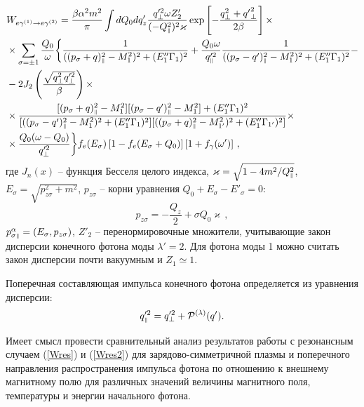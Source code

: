 \begin{equation}
	\begin{aligned}\label{Wres2}
		&W_{e\gamma^{(1)}\to e\gamma^{(2)}}=\frac{\beta\alpha^2m^2}{\pi} \int 
		dQ_0dq'_z \frac{q_\perp'^2\omega Z_2'} 
		{(-Q_{\mbox{\tiny $\|$}}^2)^2\varkappa}\exp\left[-\frac{q_\perp^2+{q'}_\perp^2}{2\beta}\right]
		\times
		\\
		\nonumber&\times\sum_{\sigma=\pm 
			1}\frac{Q_0}{\omega}\bigg\{
		\frac{1}{((p_\sigma+q)_{\mbox{\tiny $\|$}}^2-M_1^2)^2+(E''_1\Gamma_1)^2}+\frac{Q_0 \omega}{ q'^2_{\mbox{\tiny $\|$}}}\frac{1}{((p_\sigma-q')_{\mbox{\tiny $\|$}}^2-M_1^2)^2+(E''_1\Gamma_1)^2}-
		\\
		\nonumber&-2 J_{2}\left(\frac{\sqrt{q_\perp^2q_\perp'^2}}{\beta}\right)
		\times
		\\
		\nonumber&\times\frac{[(p_\sigma+q)^2_{\mbox{\tiny $\|$}}-M_1^2][(p_\sigma-q')^2_{\mbox{\tiny $\|$}}-M^2_{1}]+(E''_1\Gamma_1)^2}{[((p_\sigma-q')_{\mbox{\tiny $\|$}}^2-M_1^2)^2+(E''_1\Gamma_1)^2][((p_\sigma+q)_{\mbox{\tiny $\|$}}^2-M_{1'}^2)^2+(E''_1\Gamma_{1'})^2]}
		\times\\\nonumber&\times
		\frac{Q_0(\omega-Q_0)}{q'^2_\perp}
		\bigg\}f_e{(E_\sigma)}\left[1-f_e{(E_\sigma+Q_0)}\right]\left[1+f_\gamma(\omega')\right]
		\, ,
	\end{aligned}
\end{equation}
\noindent где $J_n(x)$ -- функция Бесселя целого индекса, 
\mbox{$\varkappa = \sqrt{1 - 4m^2/Q^2_{\mbox{\tiny $\|$}}}$, 
	$E_\sigma=\sqrt{p_{z\sigma}^2+m^2}$}, $p_{z\sigma}$ -- корни уравнения 
$Q_0+E_\sigma-E'_\sigma=0$:
\begin{equation}\label{savelaw}
	p_{z\sigma}=-\frac{Q_z}{2}+ \sigma Q_0 \varkappa\, ,
\end{equation}
$p^\alpha_{\sigma\mbox{\tiny $\|$}}=(E_\sigma,p_{z\sigma})$, $Z'_{2}$ -- перенормировочные множители, учитывающие закон дисперсии конечного фотона моды $\lambda' = 2$. Для фотона моды 1 можно считать закон дисперсии почти вакуумным и $Z_1\simeq 1$.

Поперечная составляющая импульса конечного фотона определяется из уравнения 
дисперсии:
\begin{equation}
	q'^2_{\mbox{\tiny $\|$}}=q'^{2}_\perp + {\cal P}^{(\lambda)}(q') .
\end{equation}

Имеет смысл провести сравнительный анализ результатов работы \cite{Chistyakov:2009}  с резонансным случаем (\ref{Wres}) и (\ref{Wres2}) для зарядово-симметричной плазмы и поперечного направления распространения импульса фотона по отношению к внешнему магнитному полю для различных значений величины магнитного поля, температуры и энергии начального фотона.

